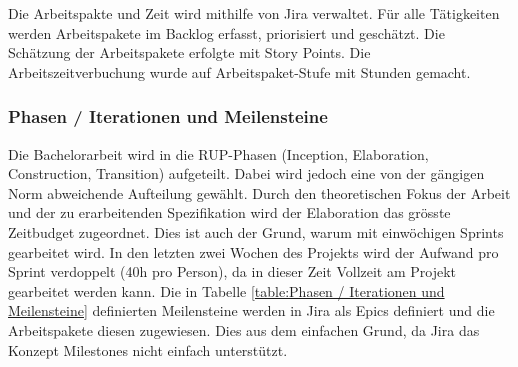 Die Arbeitspakte und Zeit wird mithilfe von Jira verwaltet.
Für alle Tätigkeiten werden Arbeitspakete im Backlog erfasst, priorisiert und geschätzt.
Die Schätzung der Arbeitspakete erfolgte mit Story Points.
Die Arbeitszeitverbuchung wurde auf Arbeitspaket-Stufe mit Stunden gemacht.

\subsubsection{Phasen / Iterationen und Meilensteine}
\label{Zeitplanung:Phasen / Iterationen und Meilensteine}

Die Bachelorarbeit wird in die \ac{RUP}-Phasen (Inception, Elaboration, Construction, Transition) aufgeteilt.
Dabei wird jedoch eine von der gängigen Norm abweichende Aufteilung gewählt.
Durch den theoretischen Fokus der Arbeit und der zu erarbeitenden Spezifikation wird der Elaboration das grösste Zeitbudget zugeordnet.
Dies ist auch der Grund, warum mit einwöchigen Sprints gearbeitet wird.
In den letzten zwei Wochen des Projekts wird der Aufwand pro Sprint verdoppelt (40h pro Person), da in dieser Zeit Vollzeit am Projekt gearbeitet werden kann.
Die in Tabelle \ref{table:Phasen / Iterationen und Meilensteine} definierten Meilensteine werden in Jira als Epics definiert und die Arbeitspakete diesen zugewiesen.
Dies aus dem einfachen Grund, da Jira das Konzept Milestones nicht einfach unterstützt.

